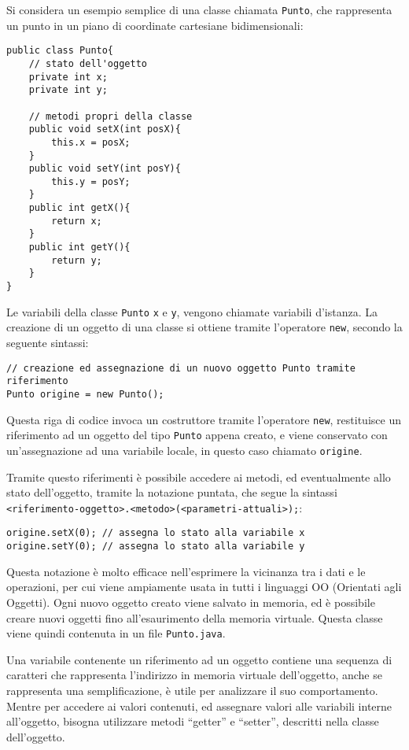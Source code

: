 \documentclass{article}
\numberwithin{equation}{subsection}
\begin{document}
Si considera un esempio semplice di una classe chiamata \verb|Punto|, che rappresenta un punto in un piano di coordinate cartesiane bidimensionali:
\begin{verbatim}
public class Punto{
    // stato dell'oggetto
    private int x;
    private int y;

    // metodi propri della classe
    public void setX(int posX){
        this.x = posX;
    }
    public void setY(int posY){
        this.y = posY;
    }
    public int getX(){
        return x;
    }
    public int getY(){
        return y;
    }
}
\end{verbatim}
Le variabili della classe \verb|Punto| \verb|x| e \verb|y|, vengono chiamate variabili d'istanza. La creazione di un oggetto di una classe si ottiene tramite l'operatore \verb|new|, 
secondo la seguente sintassi:
\begin{verbatim}
// creazione ed assegnazione di un nuovo oggetto Punto tramite riferimento
Punto origine = new Punto();
\end{verbatim}
Questa riga di codice invoca un costruttore tramite l'operatore \verb|new|, restituisce un riferimento ad un oggetto del tipo \verb|Punto| appena creato, e viene conservato 
con un'assegnazione ad una variabile locale, in questo caso chiamato \verb|origine|. 

Tramite questo riferimenti è possibile accedere ai metodi, ed eventualmente allo stato dell'oggetto, tramite la notazione puntata, che segue la sintassi 
\verb|<riferimento-oggetto>.<metodo>(<parametri-attuali>);|:  
\begin{verbatim}
origine.setX(0); // assegna lo stato alla variabile x
origine.setY(0); // assegna lo stato alla variabile y
\end{verbatim}
Questa notazione è molto efficace nell'esprimere la vicinanza tra i dati e le operazioni, per cui viene ampiamente usata in tutti i linguaggi OO (Orientati agli Oggetti). 
Ogni nuovo oggetto creato viene salvato in memoria, ed è possibile creare nuovi oggetti fino all'esaurimento della memoria virtuale. 
Questa classe viene quindi contenuta in un file \verb|Punto.java|. 


Una variabile contenente un riferimento ad un oggetto contiene una sequenza di caratteri che rappresenta l'indirizzo in memoria virtuale dell'oggetto, anche se rappresenta una 
semplificazione, è utile per analizzare il suo comportamento. Mentre per accedere ai valori contenuti, ed assegnare valori alle variabili interne all'oggetto, bisogna utilizzare 
metodi ``getter'' e ``setter'', descritti nella classe dell'oggetto. 
\end{document}
